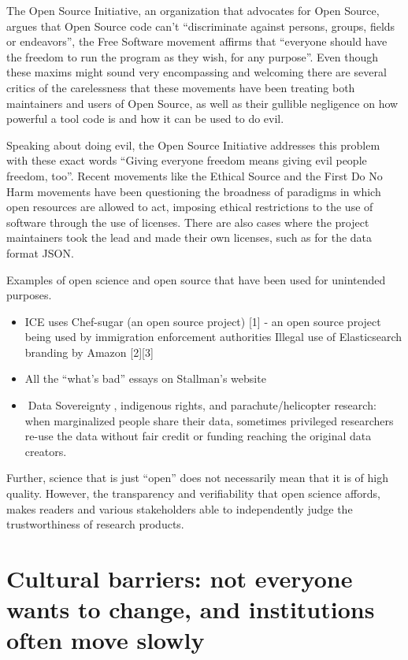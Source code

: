 \documentclass[
  letterpaper,
  DIV=11,
  numbers=noendperiod]{scrreport}
\providecommand{\tightlist}{%
  \setlength{\itemsep}{0pt}\setlength{\parskip}{0pt}}\usepackage{longtable,booktabs,array}
\begin{document}
The Open Source Initiative, an organization that advocates for Open
Source, argues that Open Source code can't ``discriminate against
persons, groups, fields or endeavors'', the Free Software movement
affirms that ``everyone should have the freedom to run the program as
they wish, for any purpose''. Even though these maxims might sound very
encompassing and welcoming there are several critics of the carelessness
that these movements have been treating both maintainers and users of
Open Source, as well as their gullible negligence on how powerful a tool
code is and how it can be used to do evil.

Speaking about doing evil, the Open Source Initiative addresses this
problem with these exact words ``Giving everyone freedom means giving
evil people freedom, too''. Recent movements like the Ethical Source and
the First Do No Harm movements have been questioning the broadness of
paradigms in which open resources are allowed to act, imposing ethical
restrictions to the use of software through the use of licenses. There
are also cases where the project maintainers took the lead and made
their own licenses, such as for the data format JSON.

Examples of open science and open source that have been used for
unintended purposes.

\begin{itemize}
\tightlist
\item
  ICE uses Chef-sugar (an open source project) {[}1{]} - an open source
  project being used by immigration enforcement authorities Illegal use
  of Elasticsearch branding by Amazon {[}2{]}{[}3{]}
\item
  All the ``what's bad'' essays on Stallman's website
\item
  📖Data Sovereignty📖, indigenous rights, and parachute/helicopter
  research: when marginalized people share their data, sometimes
  privileged researchers re-use the data without fair credit or funding
  reaching the original data creators.
\end{itemize}

Further, science that is just ``open'' does not necessarily mean that it
is of high quality. However, the transparency and verifiability that
open science affords, makes readers and various stakeholders able to
independently judge the trustworthiness of research products.

\hypertarget{cultural-barriers-not-everyone-wants-to-change-and-institutions-often-move-slowly}{%
\section{Cultural barriers: not everyone wants to change, and
institutions often move
slowly}\label{cultural-barriers-not-everyone-wants-to-change-and-institutions-often-move-slowly}}
\end{document}
